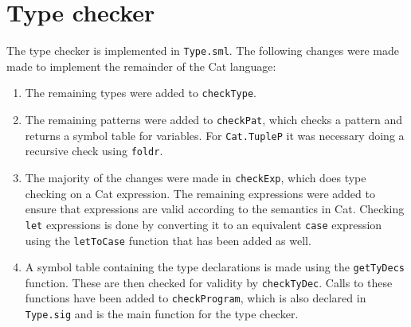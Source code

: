 \chapter{Type checker}

The type checker is implemented in \texttt{Type.sml}. The following changes
were made made to implement the remainder of the Cat language:

\begin{enumerate}
    \item {
        The remaining types were added to \texttt{checkType}.
    }
    \item {
        The remaining patterns were added to \texttt{checkPat}, which
        checks a pattern and returns a symbol table for variables. For
        \texttt{Cat.TupleP} it was necessary doing a recursive check using
        \texttt{foldr}.
    }
    \item {
        The majority of the changes were made in \texttt{checkExp}, which does
        type checking on a Cat expression. The remaining expressions were
        added to ensure that expressions are valid according to the semantics
        in Cat. Checking \texttt{let} expressions is done by converting it to
        an equivalent \texttt{case} expression using the \texttt{letToCase}
        function that has been added as well.
    }
    \item {
        A symbol table containing the type declarations is made using the
        \texttt{getTyDecs} function. These are then checked for validity by
        \texttt{checkTyDec}. Calls to these functions have been added to
        \texttt{checkProgram}, which is also declared in \texttt{Type.sig} and
        is the main function for the type checker.
    }
\end{enumerate}
